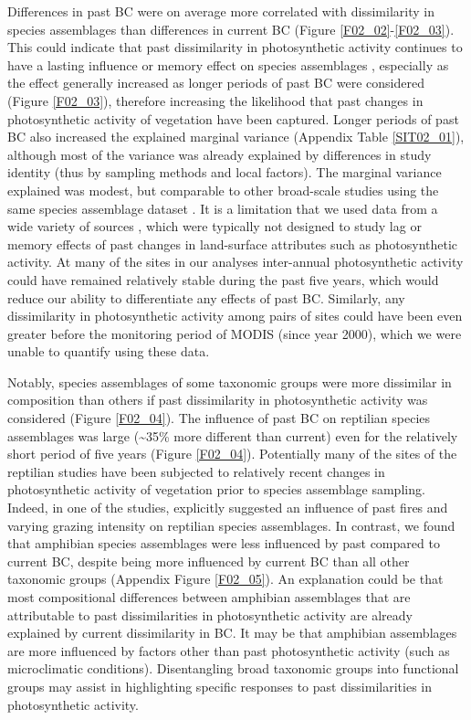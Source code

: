 Differences in past BC were on average more correlated with dissimilarity in species assemblages than differences in current BC (Figure \ref{F02_02}-\ref{F02_03}). This could indicate that past dissimilarity in photosynthetic activity continues to have a lasting influence or memory effect on species assemblages \citep{Ogle2015}, especially as the effect generally increased as longer periods of past BC were considered (Figure \ref{F02_03}), therefore increasing the likelihood that past changes in photosynthetic activity of vegetation have been captured. Longer periods of past BC also increased the explained marginal variance (Appendix Table \ref{SIT02_01}), although most of the variance was already explained by differences in study identity (thus by sampling methods and local factors). The marginal variance explained was modest, but comparable to other broad-scale studies using the same species assemblage dataset \citep{Newbold2014b,DePalma2015,Jung2016}. It is a limitation that we used data from a wide variety of sources \citep{Hudson2016}, which were typically not designed to study lag or memory effects of past changes in land-surface attributes such as photosynthetic activity. At many of the sites in our analyses inter-annual photosynthetic activity could have remained relatively stable during the past five years, which would reduce our ability to differentiate any effects of past BC. Similarly, any dissimilarity in photosynthetic activity among pairs of sites could have been even greater before the monitoring period of MODIS (since year 2000), which we were unable to quantify using these data. 

Notably, species assemblages of some taxonomic groups were more dissimilar in composition than others if past dissimilarity in photosynthetic activity was considered (Figure \ref{F02_04}). The influence of past BC on reptilian species assemblages was large (\textasciitilde35\% more different than current) even for the relatively short period of five years (Figure \ref{F02_04}). Potentially many of the sites of the reptilian studies have been subjected to relatively recent changes in photosynthetic activity of vegetation prior to species assemblage sampling. Indeed, in one of the studies, \cite{Woinarski2009} explicitly suggested an influence of past fires and varying grazing intensity on reptilian species assemblages. In contrast, we found that amphibian species assemblages were less influenced by past compared to current BC, despite being more influenced by current BC than all other taxonomic groups (Appendix Figure \ref{F02_05}). An explanation could be that most compositional differences between amphibian assemblages that are attributable to past dissimilarities in photosynthetic activity are already explained by current dissimilarity in BC. It may be that amphibian assemblages are more influenced by factors other than past photosynthetic activity (such as microclimatic conditions). Disentangling broad taxonomic groups into functional groups may assist in highlighting specific responses to past dissimilarities in photosynthetic activity.


